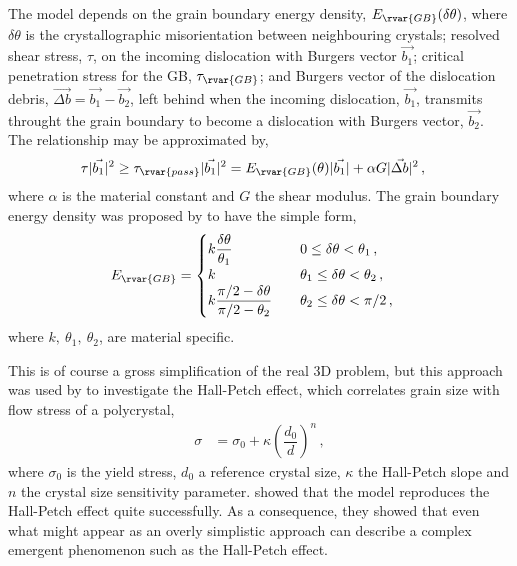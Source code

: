 The model depends on the grain boundary energy density, $ E_{\rvar{GB}}(\delta\theta) $, where $ \delta\theta $ is the crystallographic misorientation between neighbouring crystals; resolved shear stress, $ \tau $, on the incoming dislocation with Burgers vector $ \vec{b_{1}} $; critical penetration stress for the GB, $ \tau_{\rvar{GB}} $; and Burgers vector of the dislocation debris, $ \vec{\Delta b} = \vec{b_{1}} - \vec{b_{2}} $, left behind when the incoming dislocation, $ \vec{b_{1}} $, transmits throught the grain boundary to become a dislocation with Burgers vector, $ \vec{b_{2}} $. The relationship may be approximated by,
\begin{align}\label{eq:dln_trns}
    \tau \lvert\vec{b_{1}}\rvert^{2} & \geq \tau_{\rvar{pass}} \lvert\vec{b_{1}}\rvert^{2} = E_{\rvar{GB}}(\theta) \lvert\vec{b_{1}}\rvert + \alpha G \lvert\vec{\Delta b}\rvert^{2}\,,
\end{align}
where $ \alpha $ is the material constant and $ G $ the shear modulus. The grain boundary energy density was proposed by \cite{gb_e_dens} to have the simple form,
\begin{align}
    E_{\rvar{GB}} & = 	\begin{cases}
        k \dfrac{\delta\theta}{\theta_{1}}                 & \quad 0 \leq \delta\theta < \theta_{1}\,,          \\
        k                                                  & \quad \theta_{1} \leq \delta\theta < \theta_{2}\,, \\
        k \dfrac{\pi/2 - \delta\theta}{\pi/2 - \theta_{2}} & \quad \theta_{2} \leq \delta\theta < \pi/2\,,
    \end{cases}
\end{align}
where $ k,~ \theta_{1},~\theta_{2} $, are material specific.

This is of course a gross simplification of the real 3D problem, but this approach was used by \citet{2d_pcm} to investigate the Hall-Petch effect, which correlates grain size with flow stress of a polycrystal,
\begin{align}\label{eq:hall_petch}
    \sigma & = \sigma_{0} + \kappa \left(\dfrac{d_{0}}{d}\right)^{n}\,,
\end{align}
where $ \sigma_{0} $ is the yield stress, $ d_{0} $ a reference crystal size, $ \kappa $ the Hall-Petch slope and $ n $ the crystal size sensitivity parameter.  showed that the model reproduces the Hall-Petch effect quite successfully. As a consequence, they showed that even what might appear as an overly simplistic approach can describe a complex emergent phenomenon such as the Hall-Petch effect.

